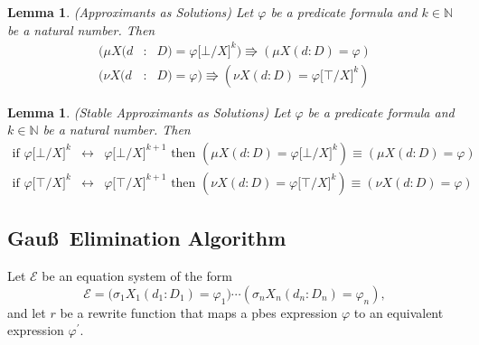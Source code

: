 \documentclass{article}
\newtheorem{lemma}[theorem]{Lemma}
\begin{document}
\begin{lemma}
(Approximants as Solutions) Let $\varphi $ be a predicate formula and $k\in
\mathbb{N}$ be a natural number. Then%
\begin{eqnarray*}
(\mu X(d &:&D)=\varphi \lbrack \bot /X]^{k})\Rrightarrow (\mu X(d:D)=\varphi
) \\
(\nu X(d &:&D)=\varphi )\Rrightarrow (\nu X(d:D)=\varphi \lbrack \top
/X]^{k})
\end{eqnarray*}
\end{lemma}

\begin{lemma}
(Stable Approximants as Solutions) Let $\varphi $ be a predicate formula and
$k\in \mathbb{N}$ be a natural number. Then%
\begin{eqnarray*}
\text{if }\varphi \lbrack \bot /X]^{k} &\longleftrightarrow &\varphi \lbrack
\bot /X]^{k+1}\text{ then }(\mu X(d:D)=\varphi \lbrack \bot /X]^{k})\equiv
(\mu X(d:D)=\varphi ) \\
\text{if }\varphi \lbrack \top /X]^{k} &\longleftrightarrow &\varphi \lbrack
\top /X]^{k+1}\text{ then }(\nu X(d:D)=\varphi \lbrack \top /X]^{k})\equiv
(\nu X(d:D)=\varphi )
\end{eqnarray*}
\end{lemma}

\pagebreak

\subsection{Gau\ss\ Elimination Algorithm}

Let $\mathcal{E}$ be an equation system of the form%
\begin{equation*}
\mathcal{E=(}\sigma _{1}X_{1}(d_{1}:D_{1})=\varphi _{1})\cdots (\sigma
_{n}X_{n}(d_{n}:D_{n})=\varphi _{n}),
\end{equation*}%
and let $r$ be a rewrite function that maps a pbes expression $\varphi $ to
an equivalent expression $\varphi ^{\prime }$.
\end{document}
